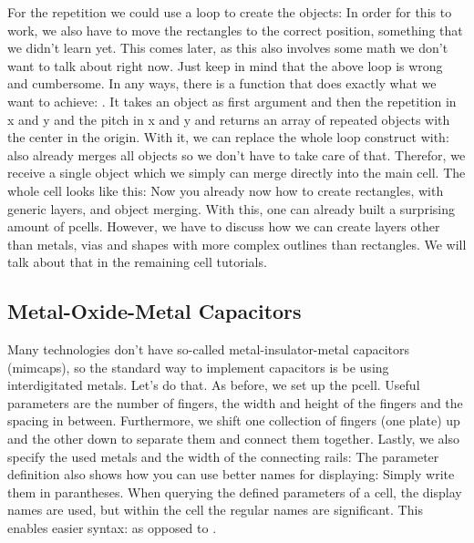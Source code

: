 For the repetition we could use a loop to create the objects:
In order for this to work, we also have to move the rectangles to the correct position, something that we didn't learn yet. This comes later, as this also involves
some math we don't want to talk about right now. Just keep in mind that the above loop is wrong and cumbersome. In any ways, there is a function that does
exactly what we want to achieve:
. It takes an object as first argument and then the repetition in x and y and the pitch in x and y and returns an array of repeated
objects with the center in the origin. With it, we can replace the whole loop construct with:
 also already merges all objects so we don't have to take care of that. Therefor, we receive a single object which we simply can
merge directly into the main cell. The whole cell looks like this:
Now you already now how to create rectangles, with generic layers,  and object merging. With this, one can already built a
surprising amount of pcells. However, we have to discuss how we can create layers other than metals, vias and shapes with more complex outlines than rectangles. We
will talk about that in the remaining cell tutorials.

\subsection{Metal-Oxide-Metal Capacitors}
Many technologies don't have so-called metal-insulator-metal capacitors (mimcaps), so the standard way to implement capacitors is be using interdigitated metals.
Let's do that. As before, we set up the pcell. Useful parameters are the number of fingers, the width and height of the fingers and the spacing in between.
Furthermore, we shift one collection of fingers (one plate) up and the other down to separate them and connect them together. Lastly, we also specify the used
metals and the width of the connecting rails:
The parameter definition also shows how you can use better names for displaying: Simply write them in parantheses. When querying the defined parameters of a
cell, the display names are used, but within the cell the regular names are significant. This enables easier syntax:  as opposed to
.

